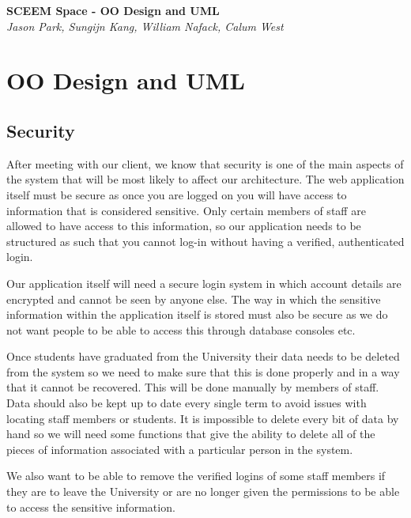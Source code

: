 \documentclass[11pt,a4paper]{article}
\begin{document}
\begin{titlepage}
   \begin{center}
      \Large\textbf{SCEEM Space - OO Design and UML}\\
      \large\textit{Jason Park, Sungijn Kang, William Nafack, Calum West}
   \end{center}
\end{titlepage}

\section{OO Design and UML}
\subsection*{\bf Security}
After meeting with our client, we know that security is one of the main aspects of the system that will be most likely to affect our architecture. The web application itself must be secure as once you are logged on you will have access to information that is considered sensitive. Only certain members of staff are allowed to have access to this information, so our application needs to be structured as such that you cannot log-in without having a verified, authenticated login.
\bigskip

Our application itself will need a secure login system in which account details are encrypted and cannot be seen by anyone else. The way in which the sensitive information within the application itself is stored must also be secure as we do not want people to be able to access this through database consoles etc. 
\bigskip

Once students have graduated from the University their data needs to be deleted from the system so we need to make sure that this is done properly and in a way that it cannot be recovered. This will be done manually by members of staff. Data should also be kept up to date every single term to avoid issues with locating staff members or students. It is impossible to delete every bit of data by hand so we will need some functions that give the ability to delete all of the pieces of information associated with a particular person in the system.
\bigskip

We also want to be able to remove the verified logins of some staff members if they are to leave the University or are no longer given the permissions to be able to access the sensitive information.
\bigskip
\end{document}
